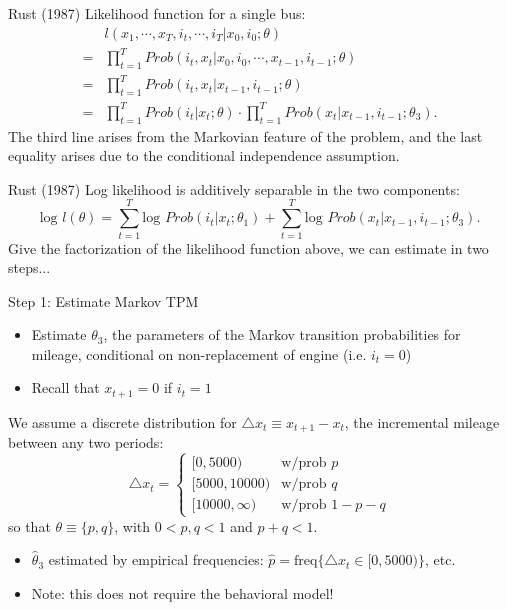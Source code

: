 \documentclass[xcolor=pdftex,dvipsnames,table,mathserif]{beamer}
\begin{document}
\begin{frame}{Rust (1987)}
Likelihood function for a single bus:
\begin{equation*}
\begin{split}
& l (x_1, \cdots , x_T, i_t, \cdots , i_T | x_0, i_0 ; \theta) \\
= & \prod^T_{t=1} Prob (i_t, x_t | x_0, i_0, \cdots , x_{t-1}, i_{t-1} ; \theta) \\
= & \prod^T_{t=1} Prob (i_t, x_t |  x_{t-1}, i_{t-1} ; \theta) \\
= & \prod^T_{t=1} Prob (i_t | x_t; \theta) \cdot \prod^T_{t=1} Prob (x_t | x_{t-1}, i_{t-1} ; \theta_3) .
\end{split}
\end{equation*}
The third line arises from the Markovian feature of the problem, and the last equality arises due to the conditional independence assumption. 
\end{frame}

\begin{frame}{Rust (1987)}
Log likelihood is additively separable in the two components:
\begin{equation*}
\text{log } l(\theta) = \sum^T_{t=1} \text{log } Prob (i_t | x_t ; \theta_1) + \sum^T_{t=1} \text{log } Prob (x_t | x_{t-1}, i_{t-1}; \theta_3).
\end{equation*}
Give the factorization of the likelihood function above, we can estimate in two steps... \\
\vspace{3mm}
\end{frame}

\begin{frame}{Step 1: Estimate Markov TPM}
\begin{itemize}
\item Estimate $\theta_3$, the parameters of the Markov transition probabilities for mileage, conditional on non-replacement of engine (i.e. $i_t = 0$)
\item Recall that $x_{t+1} = 0$ if $i_t = 1$
\end{itemize}

We assume a discrete distribution for $\triangle x_t \equiv x_{t+1} - x_t$, the incremental mileage between any two periods:
\begin{equation*}
\triangle x_t = \left \{ 
\begin{matrix}
[0, 5000) & \text{w/prob } p \\
[5000, 10000) & \text{w/prob } q \\
[10000, \infty) & \text{w/prob } 1 - p - q  
\end{matrix}
\right .
\end{equation*}
so that $\theta \equiv \{p, q \}$, with $0 < p, q< 1$ and $p + q < 1$. \\
\vspace{2mm}
\begin{itemize}
\item $\hat \theta_3$ estimated by empirical frequencies: $\hat p = \text{freq} \{ \triangle x_t \in  [0, 5000) \}$, etc. 
\item Note: this does not require the behavioral model!
\end{itemize}
\end{frame}
\end{document}

